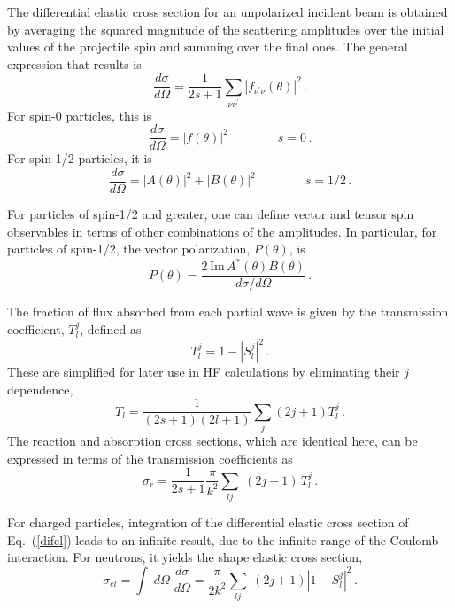 \documentclass[twocolumn,amsmath,amssymb,10pt,groupedaddress,letter]{revtex4}
\begin{document}
The differential elastic cross section for an unpolarized incident
beam is obtained by averaging the squared magnitude of the scattering
amplitudes over the initial values of the projectile spin and summing
over the final ones. The general expression that results is \begin{equation}
\frac{d\sigma}{d\Omega}=\frac{1}{2s+1}\sum_{\nu\nu^{\prime}}\left|f_{\nu^{\prime}\nu}(\theta)\right|^{2}\,.\label{difel}\end{equation}
 For spin-0 particles, this is \begin{equation}
\frac{d\sigma}{d\Omega}=\left|f(\theta)\right|^{2}\qquad\qquad s=0\,.\end{equation}
 For spin-1/2 particles, it is \begin{equation}
\frac{d\sigma}{d\Omega}=\left|A(\theta)\right|^{2}+\left|B(\theta)\right|^{2}\qquad\qquad s=1/2\,.\end{equation}

For particles of spin-1/2 and greater, one can define vector and tensor
spin observables in terms of other combinations of the amplitudes.
In particular, for particles of spin-1/2, the vector polarization,
$P(\theta)$, is \begin{equation}
P(\theta)=\frac{2\,\textrm{Im}\, A^{*}(\theta)B(\theta)}{d\sigma/d\Omega}\,.\end{equation}

The fraction of flux absorbed from each partial wave is given by the
transmission coefficient, $T_{l}^{j}$, defined as \begin{equation}
T_{l}^{j}=1-\left|S_{l}^{j}\right|^{2}\,.\end{equation}
These are simplified for later use in HF calculations by eliminating
their $j$ dependence, \begin{equation}
T_{l}=\frac{1}{(2s+1)(2l+1)}\sum_j (2j+1) T_{l}^{j}\,.\end{equation}
The reaction and absorption cross sections, which are identical here,
can be expressed in terms of the transmission coefficients as \begin{equation}
\sigma_{r}=\frac{1}{2s+1}\frac{\pi}{k^{2}}\sum_{lj}\;(2j+1)\, T_{l}^{j}\,.\end{equation}

For charged particles, integration of the differential elastic cross
section of Eq.~(\ref{difel}) leads to an infinite result, due to
the infinite range of the Coulomb interaction. For neutrons, it yields
the shape elastic cross section, \begin{equation}
\sigma_{el}=\int\; d\Omega\;\frac{d\sigma}{d\Omega}=\frac{\pi}{2k^{2}}\sum_{lj}\;(2j+1)\left|1-S_{l}^{j}\right|^{2}\,.\end{equation}
\end{document}
